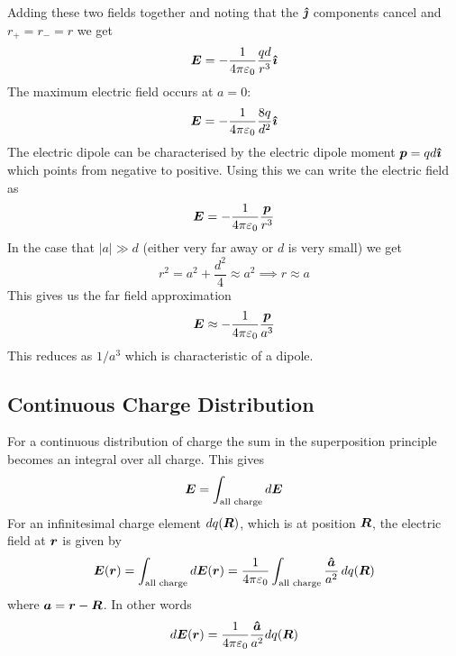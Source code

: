 \documentclass{article}
\begin{document}
    Adding these two fields together and noting that the \(\bm{\hat{\jmath}}\) components cancel and \(r_+ = r_- = r\) we get
    \[\bm{E} = -\frac{1}{4\pi\varepsilon_0}\frac{qd}{r^3}\bm{\hat{\imath}}\]
    The maximum electric field occurs at \(a = 0\):
    \[\bm{E} = -\frac{1}{4\pi\varepsilon_0}\frac{8q}{d^2}\bm{\hat{\imath}}\]
    The electric dipole can be characterised by the electric dipole moment \(\bm{p} = qd\bm{\hat{\imath}}\) which points from negative to positive.
    Using this we can write the electric field as
    \[\bm{E} = -\frac{1}{4\pi\varepsilon_0}\frac{\bm{p}}{r^3}\]
    In the case that \(|a|\gg d\) (either very far away or \(d\) is very small) we get
    \[r^2 = a^2 + \frac{d^2}{4}\approx a^2 \implies r\approx a\]
    This gives us the far field approximation
    \[\bm{E} \approx -\frac{1}{4\pi\varepsilon_0}\frac{\bm{p}}{a^3}\]
    This reduces as \(1/a^3\) which is characteristic of a dipole.
    
    \subsection{Continuous Charge Distribution}\label{sec:plane field}
    For a continuous distribution of charge the sum in the superposition principle becomes an integral over all charge.
    This gives
    \[\bm{E} = \int_\text{all charge}d\bm{E}\]
    For an infinitesimal charge element \(dq(\bm{R})\), which is at position \(\bm{R}\), the electric field at \(\bm{r}\) is given by
    \[\bm{E}(\bm{r}) = \int_\text{all charge}d\bm{E}(\bm{r}) = \frac{1}{4\pi\varepsilon_0}\int_\text{all charge}\frac{\bm{\hat{a}}}{a^2}\,dq(\bm{R})\]
    where \(\bm{a} = \bm{r} - \bm{R}\).
    In other words
    \[d\bm{E}(\bm{r}) = \frac{1}{4\pi\varepsilon_0}\frac{\bm{\hat{a}}}{a^2}dq(\bm{R})\]
    
\end{document}

